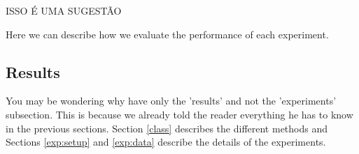 \documentclass[12pt]{article}
\begin{document}
ISSO É UMA SUGESTÃO

Here we can describe how we evaluate the performance of each experiment.

\subsection{Results} \label{exp:res}

You may be wondering why have only the 'results' and not the 'experiments' subsection. This is because we already told the reader everything he has to know in the previous sections. Section \ref{class} describes the different methods and Sections \ref{exp:setup} and \ref{exp:data} describe the details of the experiments.


\begin{table}[h]
\centering
\caption{Model of confusion matrix PRA EU N TER Q FAZER ISSO DE NOVO}
\label{tab:confusion}
\end{table}
\end{document}
